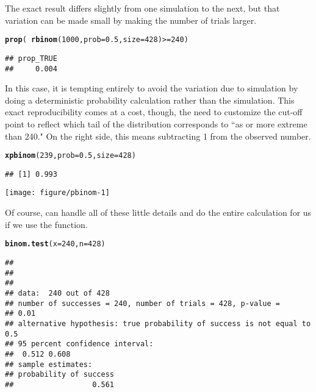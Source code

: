 \documentclass[11pt]{article}\usepackage[]{graphicx}\usepackage[]{color}
\makeatletter
\def\maxwidth{ %
  \ifdim\Gin@nat@width>\linewidth
    \linewidth
  \else
    \Gin@nat@width
  \fi
}
\newcommand{\hlnum}[1]{\textcolor[rgb]{0.686,0.059,0.569}{#1}}%
\newcommand{\hlopt}[1]{\textcolor[rgb]{0,0,0}{#1}}%
\newcommand{\hlstd}[1]{\textcolor[rgb]{0.345,0.345,0.345}{#1}}%
\newcommand{\hlkwc}[1]{\textcolor[rgb]{0.333,0.667,0.333}{#1}}%
\newcommand{\hlkwd}[1]{\textcolor[rgb]{0.737,0.353,0.396}{\textbf{#1}}}%
\newenvironment{kframe}{%
 \def\at@end@of@kframe{}%
 \ifinner\ifhmode%
  \def\at@end@of@kframe{\end{minipage}}%
  \begin{minipage}{\columnwidth}%
 \fi\fi%
 \def\FrameCommand##1{\hskip\@totalleftmargin \hskip-\fboxsep
 \colorbox{shadecolor}{##1}\hskip-\fboxsep
     \hskip-\linewidth \hskip-\@totalleftmargin \hskip\columnwidth}%
 \MakeFramed {\advance\hsize-\width
   \@totalleftmargin\z@ \linewidth\hsize
   \@setminipage}}%
 {\par\unskip\endMakeFramed%
 \at@end@of@kframe}
\newenvironment{knitrout}{}{} %
\makeatother
\begin{document}
The exact result differs slightly from one simulation to the next, but that variation can be made small by making the number of trials larger.

\begin{knitrout}
\color{fgcolor}\begin{kframe}
\begin{alltt}
\hlkwd{prop}\hlstd{(}\hlopt{~} \hlkwd{rbinom}\hlstd{(}\hlnum{1000}\hlstd{,} \hlkwc{prob} \hlstd{=} \hlnum{0.5}\hlstd{,} \hlkwc{size} \hlstd{=} \hlnum{428}\hlstd{)} \hlopt{>=} \hlnum{240}\hlstd{)}
\end{alltt}
\begin{verbatim}
## prop_TRUE 
##     0.004
\end{verbatim}
\end{kframe}
\end{knitrout}

In this case, it is 
tempting entirely to avoid the variation due to simulation by doing a deterministic
probability calculation rather than the simulation.  This exact reproducibility comes at
a cost, though, the need to customize the cut-off point to reflect which tail of the distribution corresponds to ``as or more extreme than 240."  On the right side, this means subtracting 1 from the observed number.
\begin{knitrout}
\color{fgcolor}\begin{kframe}
\begin{alltt}
\hlkwd{xpbinom}\hlstd{(}\hlnum{239}\hlstd{,} \hlkwc{prob} \hlstd{=} \hlnum{0.5}\hlstd{,} \hlkwc{size} \hlstd{=} \hlnum{428}\hlstd{)}
\end{alltt}
\begin{verbatim}
## [1] 0.993
\end{verbatim}
\end{kframe}

{\centering \texttt{[image: figure/pbinom-1]} 

}



\end{knitrout}

Of course, \R{} can handle all of these little details and do the entire 
calculation for us if we use the  function.
\begin{knitrout}
\color{fgcolor}\begin{kframe}
\begin{alltt}
\hlkwd{binom.test}\hlstd{(}\hlkwc{x} \hlstd{=} \hlnum{240}\hlstd{,} \hlkwc{n} \hlstd{=} \hlnum{428}\hlstd{)}
\end{alltt}
\begin{verbatim}
## 
## 
## 
## data:  240 out of 428
## number of successes = 240, number of trials = 428, p-value =
## 0.01
## alternative hypothesis: true probability of success is not equal to 0.5
## 95 percent confidence interval:
##  0.512 0.608
## sample estimates:
## probability of success 
##                  0.561
\end{verbatim}
\end{kframe}
\end{knitrout}
\end{document}
